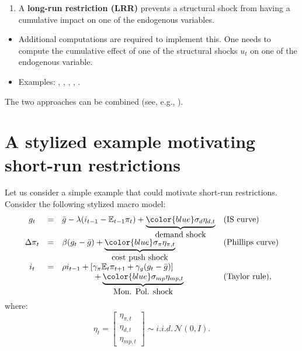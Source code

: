 \documentclass[
  12pt,
]{book}
\providecommand{\tightlist}{%
  \setlength{\itemsep}{0pt}\setlength{\parskip}{0pt}}
\theoremstyle{definition}
\theoremstyle{definition}
\theoremstyle{definition}
\theoremstyle{definition}
\theoremstyle{remark}
\begin{document}
\begin{enumerate}
\def\labelenumi{\arabic{enumi}.}
\setcounter{enumi}{1}
\tightlist
\item
  A \textbf{long-run restriction (LRR)} prevents a structural shock from having a cumulative impact on one of the endogenous variables.
\end{enumerate}

\begin{itemize}
\tightlist
\item
  Additional computations are required to implement this. One needs to compute the cumulative effect of one of the structural shocks \(u_{t}\) on one of the endogenous variable.
\item
  Examples: \citet{Blanchard_Quah_1989}, \citet{Faust_Leeper_1997}, \citet{Gali_1999}, \citet{Erceg_et_al_2005}, \citet{NBERc11177}.
\end{itemize}

The two approaches can be combined (see, e.g., \citet{Gerlach_Smets_1995}).

\hypertarget{a-stylized-example-motivating-short-run-restrictions}{%
\section{A stylized example motivating short-run restrictions}\label{a-stylized-example-motivating-short-run-restrictions}}

Let us consider a simple example that could motivate short-run restrictions. Consider the following stylized macro model:
\begin{equation}
\begin{array}{clll}
g_{t}&=& \bar{g}-\lambda(i_{t-1}-\mathbb{E}_{t-1}\pi_{t})+ \underbrace{{\color{blue}\sigma_d \eta_{d,t}}}_{\mbox{demand shock}}& (\mbox{IS curve})\\
\Delta \pi_{t} & = & \beta (g_{t} - \bar{g})+ \underbrace{{\color{blue}\sigma_{\pi} \eta_{\pi,t}}}_{\mbox{cost push shock}} & (\mbox{Phillips curve})\\
i_{t} & = & \rho i_{t-1} + \left[ \gamma_\pi \mathbb{E}_{t}\pi_{t+1}  + \gamma_g (g_{t} - \bar{g}) \right]\\
&& \qquad \qquad+\underbrace{{\color{blue}\sigma_{mp} \eta_{mp,t}}}_{\mbox{Mon. Pol. shock}} & (\mbox{Taylor rule}),
\end{array}\label{eq:systemI}
\end{equation}
where:
\begin{equation}
\eta_t = 
\left[
\begin{array}{c}
\eta_{\pi,t}\\
\eta_{d,t}\\
\eta_{mp,t}
\end{array}
\right]
\sim i.i.d.\,\mathcal{N}(0,I).\label{eq:covU}
\end{equation}
\end{document}
